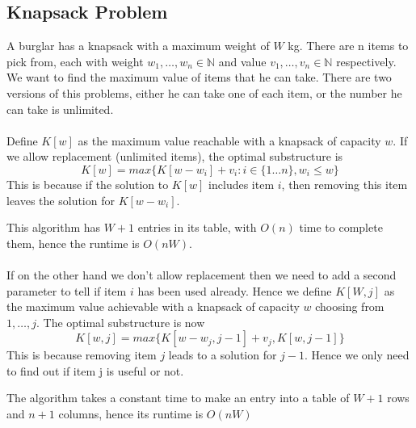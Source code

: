 \documentclass{article}
\begin{document}
    \subsection{Knapsack Problem}
        A burglar has a knapsack with a maximum weight of $W$ kg. There are n items to pick from, each with weight $w_1, \dots, w_n \in \mathbb{N}$ and value $v_1, \dots, v_n \in \mathbb{N}$ respectively. We want to find the maximum value of items that he can take. There are two versions of this problems, either he can take one of each item, or the number he can take is unlimited. \\ \\
        Define $K[w]$ as the maximum value reachable with a knapsack of capacity $w$. If we allow replacement (unlimited items), the optimal substructure is
        \[ K[w] = max \{ K[w - w_i] + v_i : i \in \{1 \dots n \}, w_i \leq w \} \]
        This is because if the solution to $K[w]$ includes item $i$, then removing this item leaves the solution for $K[w - w_i]$.
        \begin{algorithmic}[1]
            \EndFor
        \end{algorithmic}
        This algorithm has $W + 1$ entries in its table, with $O(n)$ time to complete them, hence the runtime is $O(nW)$. \\ \\
        If on the other hand we don't allow replacement then we need to add a second parameter to tell if item $i$ has been used already. Hence we define $K[W,j]$ as the maximum value achievable with a knapsack of capacity $w$ choosing from $1, \dots , j$. The optimal substructure is now
        \[ K[w, j] = max \{ K[w-w_j, j-1] + v_j, K[w, j-1]\} \]
        This is because removing item $j$ leads to a solution for $j - 1$. Hence we only need to find out if item j is useful or not.
        \begin{algorithmic}[1]
            \EndFor
            \EndFor
                    \Else
                    \EndIf
                \EndFor
            \EndFor
        \end{algorithmic}
        The algorithm takes a constant time to make an entry into a table of $W+1$ rows and $n + 1$ columns, hence its runtime is $O(nW)$
\end{document}
